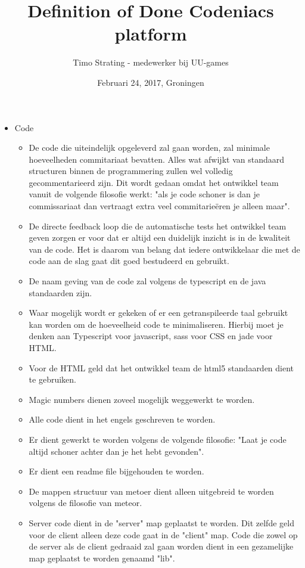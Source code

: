 \documentclass[]{report}
\title{Definition of Done Codeniacs platform}
\author{Timo Strating - medewerker bij UU-games}
\date{Februari 24, 2017, Groningen}
\begin{document}
\maketitle



\begin{itemize}
	\item Code
	\begin{itemize}
		\item De code die uiteindelijk opgeleverd zal gaan worden, zal minimale hoeveelheden commitariaat bevatten. Alles wat afwijkt van standaard structuren binnen de programmering zullen wel volledig gecommentarieerd zijn. Dit wordt gedaan omdat het ontwikkel team vanuit de volgende filosofie werkt: "als je code schoner is dan je commissariaat dan vertraagt extra veel commitarie\"{e}ren je alleen maar".
		\item De directe feedback loop die de automatische tests het ontwikkel team geven zorgen er voor dat er altijd een duidelijk inzicht is in de kwaliteit van de code. Het is daarom van belang dat iedere ontwikkelaar die met de code aan de slag gaat dit goed bestudeerd en gebruikt.
		\item De naam geving van de code zal volgens de typescript en de java standaarden zijn.
		\item Waar mogelijk wordt er gekeken of er een getranspileerde taal gebruikt kan worden om de hoeveelheid code te minimaliseren. Hierbij moet je denken aan Typescript voor javascript, sass voor CSS en jade voor HTML. 
		\item Voor de HTML geld dat het ontwikkel team de html5 standaarden dient te gebruiken.
		\item Magic numbers dienen zoveel mogelijk weggewerkt te worden.
		\item Alle code dient in het engels geschreven te worden.
		\item Er dient gewerkt te worden volgens de volgende filosofie: "Laat je code altijd schoner achter dan je het hebt gevonden".
		\item Er dient een readme file bijgehouden te worden.
		\item De mappen structuur van metoer dient alleen uitgebreid te worden volgens de filosofie van meteor.
		\item Server code dient in de "server" map geplaatst te worden. Dit zelfde geld voor de client alleen deze code gaat in de "client" map. Code die zowel op de server als de client gedraaid zal gaan worden dient in een gezamelijke map geplaatst te worden genaamd "lib".

\end{itemize}
\end{itemize}
\end{document}
